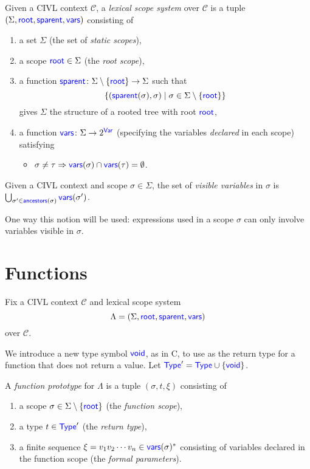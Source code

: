 \documentclass[11pt, oneside, letterpaper]{book}
\begin{document}
\begin{definition}
  Given a CIVL context $\mathcal{C}$, a \emph{lexical scope system}
  over $\mathcal{C}$ is a tuple $(\Sigma,\textsf{\textcolor{blue}{\textup{root}}},\textsf{\textcolor{blue}{\textup{sparent}}},\textsf{\textcolor{blue}{\textup{vars}}})$
  consisting of
  \begin{enumerate}
  \item a set $\Sigma$ (the set of \emph{static scopes}),
  \item a scope $\textsf{\textcolor{blue}{\textup{root}}}\in\Sigma$ (the  \emph{root scope}),
  \item a function
    $\textsf{\textcolor{blue}{\textup{sparent}}}\colon\Sigma\setminus\{\textsf{\textcolor{blue}{\textup{root}}}\}\rightarrow
    \Sigma$ such that 
    \[\{(\textsf{\textcolor{blue}{\textup{sparent}}}(\sigma),\sigma)\mid \sigma\in\Sigma\setminus\{\textsf{\textcolor{blue}{\textup{root}}}\}\}\]
    gives $\Sigma$ the structure of a rooted tree with root $\textsf{\textcolor{blue}{\textup{root}}}$,
  \item a function $\textsf{\textcolor{blue}{\textup{vars}}}\colon\Sigma\rightarrow 2^{\textsf{\textcolor{blue}{\textup{Var}}}}$ 
    (specifying the variables \emph{declared} in each scope) satisfying
    \begin{itemize}
    \item $\sigma\neq\tau\Rightarrow \textsf{\textcolor{blue}{\textup{vars}}}(\sigma)\cap \textsf{\textcolor{blue}{\textup{vars}}}(\tau)=\emptyset$.
    \end{itemize}
  \end{enumerate}
\end{definition}

\begin{definition}
  Given a CIVL context and scope $\sigma\in\Sigma$,
  the set of \emph{visible variables} in $\sigma$
  is $\bigcup_{\sigma'\in\textsf{\textcolor{blue}{\textup{ancestors}}}(\sigma)}\textsf{\textcolor{blue}{\textup{vars}}}(\sigma')$.
\end{definition}

One way this notion will be used: expressions used in a scope $\sigma$
can only involve variables visible in $\sigma$.

\section{Functions}
\label{sec:functions}

Fix a CIVL context $\mathcal{C}$ and lexical scope system
\[\Lambda=(\Sigma,\textsf{\textcolor{blue}{\textup{root}}},\textsf{\textcolor{blue}{\textup{sparent}}},\textsf{\textcolor{blue}{\textup{vars}}})\] over $\mathcal{C}$.

We introduce a new type symbol $\textsf{\textcolor{blue}{\textup{void}}}$, as in C, to use as the return
type for a function that does not return a value.  Let
$\textsf{\textcolor{blue}{\textup{Type}}}'=\textsf{\textcolor{blue}{\textup{Type}}}\cup\{\textsf{\textcolor{blue}{\textup{void}}}\}$.

\begin{definition}
  A \emph{function prototype} for $\Lambda$ is a tuple
  $(\sigma, t, \xi)$  consisting of
  \begin{enumerate}
  \item a scope $\sigma\in\Sigma\setminus\{\textsf{\textcolor{blue}{\textup{root}}}\}$
    (the \emph{function scope}),
  \item a type $t\in\textsf{\textcolor{blue}{\textup{Type}}}'$ (the \emph{return type}),
  \item a finite sequence $\xi=v_1v_2\cdots v_n\in\textsf{\textcolor{blue}{\textup{vars}}}(\sigma)^*$
    consisting of variables declared in the function scope
    (the \emph{formal parameters}).
  \end{enumerate}
\end{definition}
\end{document}
